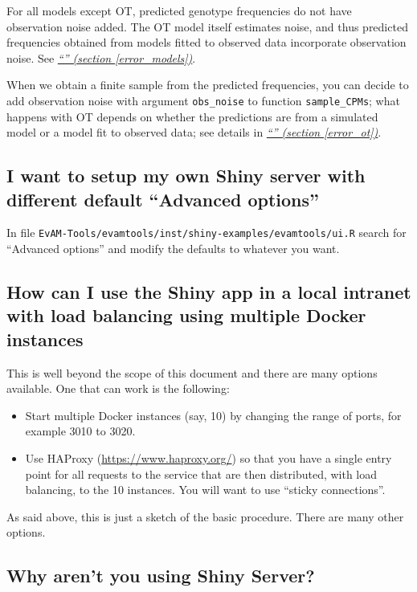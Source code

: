 \documentclass[a4paper,11pt]{article}
\newcommand*{\qref}[1]{\hyperref[{#1}]{\textit{``\nameref*{#1}'' (section \ref*{#1})}}}
\begin{document}
For all models except OT, predicted genotype frequencies do not have observation noise added. The OT model itself estimates noise, and thus predicted frequencies obtained from models fitted to observed data incorporate observation noise. See \qref{error_models}.

When we obtain a finite sample from the predicted frequencies, you can decide to add observation noise with argument \texttt{obs\_noise} to function \texttt{sample\_CPMs}; what happens with OT depends on whether the predictions are from a simulated model or a model fit to observed data; see details in \qref{error_ot}.




\subsection{I want to setup my own Shiny server with different default ``Advanced options''}

In file \texttt{EvAM-Tools/evamtools/inst/shiny-examples/evamtools/ui.R} search for ``Advanced options'' and modify the defaults to whatever you want.


\subsection{How can I use the Shiny app in a local intranet with load balancing using multiple Docker instances}
\label{haproxy}

This is well beyond the scope of this document and there are many options available. One that can work is the following:
\begin{itemize}
\item Start multiple Docker instances (say, 10) by changing the range of ports, for example 3010 to 3020.
\item Use HAProxy (\url{https://www.haproxy.org/}) so that you have a single entry point for all requests to the service that are then distributed, with load balancing, to the 10 instances. You will want to use ``sticky connections''.
\end{itemize}

As said above, this is just a sketch of the basic procedure. There are many other options.


\subsection{Why aren't you using Shiny Server?}
\label{sec:why-arent-you}
\end{document}
